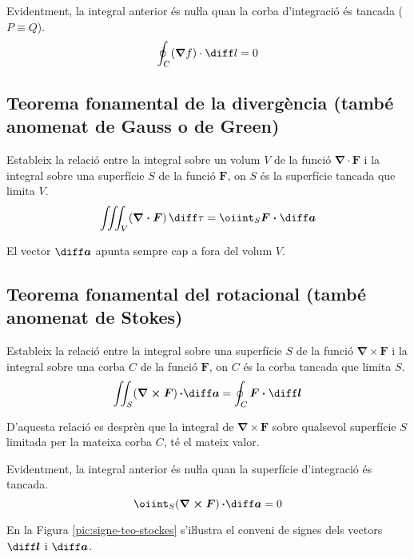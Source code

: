 \documentclass[catalan,a4paper,twoside,11pt]{article}
\begin{document}
Evidentment, la integral anterior és nuŀla quan la corba d'integració és tancada ($P \equiv Q$).
\begin{equation}
    \oint_C (\boldsymbol{\nabla}f) \cdot \diff l = 0
\end{equation}

\subsection{Teorema fonamental de la divergència (també anomenat de Gauss o de Green)}
Estableix la relació entre la integral sobre un volum $V$ de la funció $\boldsymbol{\nabla\cdot F}$ i la integral sobre una superfície $S$ de la funció $\boldsymbol{F}$, on $S$ és la superfície tancada que limita $V$.
\begin{equation}
    \iiint_V(\boldsymbol{\nabla\cdot F})\,\diff \tau = \oiint_S\boldsymbol{F\cdot\diff a}
\end{equation}

El vector $\boldsymbol{\diff a}$ apunta sempre cap a fora del volum $V$.

\subsection{Teorema fonamental del rotacional (també anomenat de Stokes)}
Estableix la relació entre la integral sobre una superfície $S$ de la funció $\boldsymbol{\nabla\times F}$ i la integral sobre una corba $C$ de la funció $\boldsymbol{F}$, on $C$ és la corba tancada que limita $S$.
\begin{equation}
    \iint_S(\boldsymbol{\nabla\times F})\boldsymbol{\,\cdot\diff a} =
    \oint_C\boldsymbol{F\cdot\diff l}
\end{equation}

D'aquesta relació es desprèn que la integral de $\boldsymbol{\nabla\times F}$ sobre qualsevol superfície $S$ limitada per la mateixa corba $C$, té el mateix valor.

Evidentment, la integral anterior és nuŀla quan la superfície d'integració és tancada.
\begin{equation}
    \oiint_S(\boldsymbol{\nabla\times F})\boldsymbol{\,\cdot\diff a} = 0
\end{equation}

En la Figura \vref{pic:signe-teo-stockes} s'iŀlustra el conveni de
signes dels vectors $\boldsymbol{\diff l}$ i $\boldsymbol{\diff a}$.

\begin{center}
	
	\label{pic:signe-teo-stockes}
\end{center}
\end{document}
